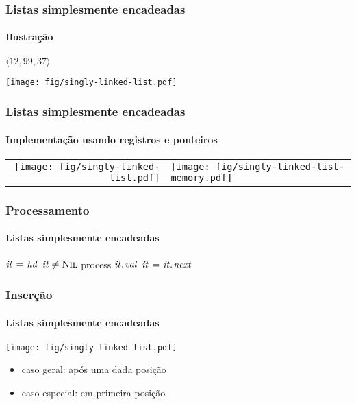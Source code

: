 \documentclass{beamer}
\begin{document}
\begin{frame}
  \frametitle{Listas simplesmente encadeadas}
  \framesubtitle{Ilustração}

  $\langle 12, 99, 37 \rangle$

  \begin{center}
    \texttt{[image: fig/singly-linked-list.pdf]}
  \end{center}

\end{frame}

\begin{frame}
  \frametitle{Listas simplesmente encadeadas}
  \framesubtitle{Implementação usando registros e ponteiros}

  \begin{center}
    \begin{tabular}{rl}
    \texttt{[image: fig/singly-linked-list.pdf]}
    &
    \texttt{[image: fig/singly-linked-list-memory.pdf]}
    \end{tabular}
  \end{center}

\end{frame}

\begin{frame}
  \frametitle{Processamento}
  \framesubtitle{Listas simplesmente encadeadas}
  
  \begin{codebox}
    \zi $\id{it} \gets \id{hd}$
    \zi \While $\id{it} \neq \const{Nil}$
    \zi \Do
          \Comment process $\attrib{\id{it}}{val}$
    \zi   $\id{it} \gets \attrib{\id{it}}{next}$
        \End
  \end{codebox}
\end{frame}

\begin{frame}
  \frametitle{Inserção}
  \framesubtitle{Listas simplesmente encadeadas}

  \begin{center}
    \texttt{[image: fig/singly-linked-list.pdf]}
  \end{center}
  \begin{itemize}
    \item caso geral: \alert{após} uma dada posição
    \item caso especial: em primeira posição
  \end{itemize}
\end{frame}
\end{document}
